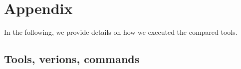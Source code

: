 \chapter{Appendix} \label{ch:appendix}

In the following, we provide details on how we executed the compared tools.

\section{Tools, verions, commands} \label{sec:commands}


%
%
%